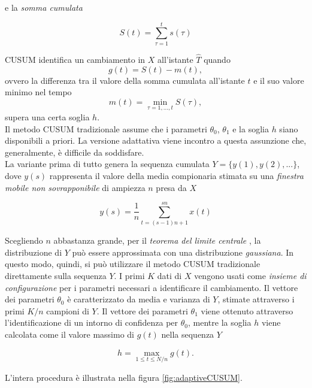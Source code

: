                 e la \textit{somma cumulata}
				
                \[ S(t) = \sum^t_{\tau=1} s(\tau) \]
				
                CUSUM identifica un cambiamento in $X$ all'istante $\widehat{T}$ quando \[g(t)=S(t)-m(t),\] ovvero la differenza tra il valore della somma cumulata all'istante $t$ e il suo valore minimo nel tempo \[m(t)=\min_{\tau=1,...,t}S(\tau),\] supera una certa soglia $h$.\\
				
                Il metodo CUSUM tradizionale assume che i parametri $\theta_0$, $\theta_1$ e la soglia $h$ siano disponibili a priori. La versione adattativa viene incontro a questa assunzione che, generalmente, \`e difficile da soddisfare.\\
                La variante prima di tutto genera la sequenza cumulata
                $Y=\{y(1),y(2),...\}$, dove $y(s)$ rappresenta il
                valore della media compionaria stimata su una
                \textit{finestra mobile non sovrapponibile} di
                ampiezza $n$ presa da $X$
				
                \[ y(s) = \frac{1}{n} \sum_{t=(s-1)n+1}^{sn}x(t) \]
				
                Scegliendo $n$ abbastanza grande, per il
                \textit{teorema del limite centrale}
                \cite{ross2009introduction}, la distribuzione di $Y$
                pu\`o essere approssimata con una distribuzione
                \textit{gaussiana}. In questo modo, quindi, si pu\`o
                utilizzare il metodo CUSUM tradizionale direttamente
                sulla sequenza $Y$. I primi $K$ dati di $X$ vengono
                usati come \textit{insieme di configurazione} per i
                parametri necessari a identificare il cambiamento. Il
                vettore dei parametri $\theta_0$ \`e caratterizzato da
                media e varianza di $Y$, stimate attraverso i primi
                $K/n$ campioni di $Y$. Il vettore dei parametri
                $\theta_1$ viene ottenuto attraverso l'identificazione
                di un intorno di confidenza per $\theta_0$, mentre la
                soglia $h$ viene calcolata come il valore massimo di
                $g(t)$ nella sequenza $Y$
				
                \[ h=\max_{1\leq t\leq N/n}g(t). \]
				
                \noindent L'intera procedura \`e illustrata nella
                figura \ref{fig:adaptiveCUSUM}.
				
